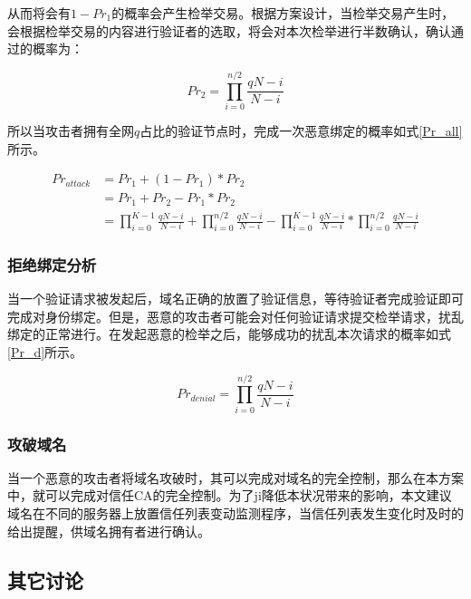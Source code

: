 从而将会有$1-Pr_1$的概率会产生检举交易。根据方案设计，当检举交易产生时，会根据检举交易的内容进行验证者的选取，将会对本次检举进行半数确认，确认通过的概率为：

\begin{equation}\label{Pr_2}
Pr_2 = \prod_{i=0}^{n/2}\frac{qN-i}{N-i}
\end{equation}

所以当攻击者拥有全网$q$占比的验证节点时，完成一次恶意绑定的概率如式\ref{Pr_all}所示。

\begin{equation}
\begin{aligned}
\label{Pr_all}  Pr_{attack} &= Pr_1 + (1-Pr_1) * Pr_2 \\
							&= Pr_1 + Pr_2 - Pr_1 * Pr_2 \\
             				&= \prod_{i=0}^{K-1}\frac{qN-i}{N-i} + \prod_{i=0}^{n/2}\frac{qN-i}{N-i} - \prod_{i=0}^{K-1}\frac{qN-i}{N-i} * \prod_{i=0}^{n/2}\frac{qN-i}{N-i} 
\end{aligned}
\end{equation}




\subsubsection{拒绝绑定分析}

当一个验证请求被发起后，域名正确的放置了验证信息，等待验证者完成验证即可完成对身份绑定。但是，恶意的攻击者可能会对任何验证请求提交检举请求，扰乱绑定的正常进行。在发起恶意的检举之后，能够成功的扰乱本次请求的概率如式\ref{Pr_d}所示。

\begin{equation}\label{Pr_d}
Pr_{denial} = \prod_{i=0}^{n/2}\frac{qN-i}{N-i}
\end{equation}

\subsubsection{攻破域名}

当一个恶意的攻击者将域名攻破时，其可以完成对域名的完全控制，那么在本方案中，就可以完成对信任CA的完全控制。为了ji降低本状况带来的影响，本文建议域名在不同的服务器上放置信任列表变动监测程序，当信任列表发生变化时及时的给出提醒，供域名拥有者进行确认。





\subsection{其它讨论}


